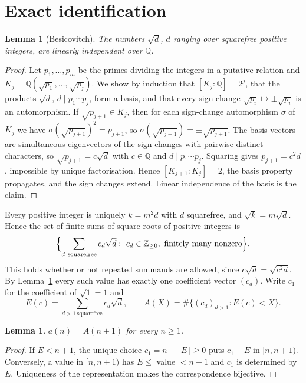 \documentclass[11pt,a4paper]{article}
\newtheorem{lemma}[theorem]{Lemma}
\theoremstyle{remark}
\begin{document}
\section{Exact identification}

\begin{lemma}[Besicovitch]\label{lem:indep}
The numbers $\sqrt d$, $d$ ranging over squarefree positive integers, are linearly independent over $\mathbb Q$.
\end{lemma}

\begin{proof}
Let $p_1,\dots,p_m$ be the primes dividing the integers in a putative relation and $K_j=\mathbb Q(\sqrt{p_1},\dots,\sqrt{p_j})$. We show by induction that $[K_j:\mathbb Q]=2^j$, that the products $\sqrt{d}$, $d\mid p_1\cdots p_j$, form a basis, and that every sign change $\sqrt{p_i}\mapsto\pm\sqrt{p_i}$ is an automorphism. If $\sqrt{p_{j+1}}\in K_j$, then for each sign-change automorphism $\sigma$ of $K_j$ we have $\sigma(\sqrt{p_{j+1}})^2=p_{j+1}$, so $\sigma(\sqrt{p_{j+1}})=\pm\sqrt{p_{j+1}}$. The basis vectors are simultaneous eigenvectors of the sign changes with pairwise distinct characters, so $\sqrt{p_{j+1}}=c\sqrt d$ with $c\in\mathbb Q$ and $d\mid p_1\cdots p_j$. Squaring gives $p_{j+1}=c^2d$, impossible by unique factorisation. Hence $[K_{j+1}:K_j]=2$, the basis property propagates, and the sign changes extend. Linear independence of the basis is the claim.
\end{proof}

Every positive integer is uniquely $k=m^2d$ with $d$ squarefree, and $\sqrt k=m\sqrt d$. Hence the set of finite sums of square roots of positive integers is
\[
 \Bigl\{\sum_{d\ \mathrm{squarefree}}c_d\sqrt d:\ c_d\in\mathbb Z_{\ge0},\ \text{finitely many nonzero}\Bigr\}.
\]
This holds whether or not repeated summands are allowed, since $c\sqrt d=\sqrt{c^2d}$. By Lemma~\ref{lem:indep} every such value has exactly one coefficient vector $(c_d)$. Write $c_1$ for the coefficient of $\sqrt1=1$ and
\[
 E(c)=\sum_{d>1\ \mathrm{squarefree}}c_d\sqrt d,\qquad A(X)=\#\{(c_d)_{d>1}:E(c)<X\}.
\]

\begin{lemma}\label{lem:ident}
$a(n)=A(n+1)$ for every $n\ge1$.
\end{lemma}

\begin{proof}
If $E<n+1$, the unique choice $c_1=n-\lfloor E\rfloor\ge0$ puts $c_1+E$ in $[n,n+1)$. Conversely, a value in $[n,n+1)$ has $E\le$ value $<n+1$ and $c_1$ is determined by $E$. Uniqueness of the representation makes the correspondence bijective.
\end{proof}
\end{document}
